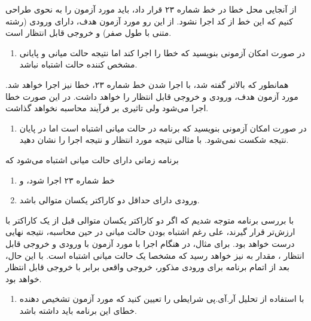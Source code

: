 \documentclass{article}
\newenvironment{answer}{}{\\[.3ex]}
\newenvironment{qitem}[1]{%
	\begin{enumerate}\item[(#1)]}{\end{enumerate}}
\begin{document}
\begin{answer}
از آنجایی محل خطا در خط شماره ۲۳ قرار داد، باید مورد آزمون را به نحوی طراحی کنیم که این خط از کد اجرا نشود. از این رو مورد آزمون هدف، دارای ورودی  (رشته متنی با طول صفر) و خروجی قابل انتظار  است.
\end{answer}
\begin{qitem}{c}
در صورت امکان آزمونی بنویسید که خطا را اجرا کند اما نتیجه حالت میانی و پایانی مشخص کننده حالت اشتباه نباشد.
\end{qitem}
\begin{answer}
همانطور که بالاتر گفته شد، با اجرا شدن خط شماره ۲۳، خطا نیز اجرا خواهد شد. مورد آزمون هدف، ورودی  و خروجی قابل انتظار  را خواهد داشت. در این صورت خطا اجرا می‌شود ولی تاثیری بر فرآیند محاسبه نخواهد گذاشت.
\end{answer}
\begin{qitem}{d}
در صورت امکان آزمونی بنویسید که برنامه در حالت میانی اشتباه است اما در پایان نتیجه شکست نمی‌شود. با مثالی نتیجه مورد انتظار و نتیجه اجرا را نشان دهید.
\end{qitem}
\begin{answer}
برنامه زمانی دارای حالت میانی اشتباه می‌شود که
\begin{enumerate}
	\item خط شماره ۲۳ اجرا شود، و
	\item ورودی دارای حداقل دو کاراکتر یکسان متوالی باشد.
\end{enumerate}
با بررسی برنامه متوجه شدیم که اگر دو کاراکتر یکسان متوالی قبل از یک کاراکتر با ارزش‌تر قرار گیرند، علی رغم اشتباه بودن حالت میانی در حین محاسبه، نتیجه نهایی درست خواهد بود. برای مثال، در هنگام اجرا با مورد آزمون با ورودی  و خروجی قابل انتظار ، مقدار  به  نیز خواهد رسید که مشخصا یک حالت میانی اشتباه است. با این حال، بعد از اتمام برنامه برای ورودی مذکور، خروجی واقعی برابر با خروجی قابل انتظار خواهد بود.
\end{answer}
\begin{qitem}{e}
با استفاده از تحلیل آر.آی.پی شرایطی را تعیین کنید که مورد آزمون تشخیص دهنده خطای این برنامه باید داشته باشد.
\end{qitem}
\end{document}
